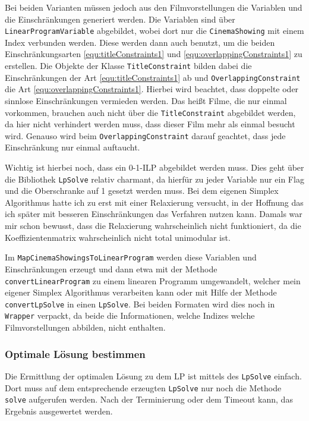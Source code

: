 \documentclass[a4paper, 12pt]{article}
\begin{document}
Bei beiden Varianten müssen jedoch aus den Filmvorstellungen die Variablen und die Einschränkungen generiert werden.
Die Variablen sind über \texttt{LinearProgramVariable} abgebildet, wobei dort nur die \texttt{CinemaShowing} mit einem Index verbunden werden.
Diese werden dann auch benutzt, um die beiden Einschränkungsarten \eqref{equ:titleConstraints1} und \eqref{equ:overlappingConstraints1} zu erstellen.
Die Objekte der Klasse \texttt{TitleConstraint} bilden dabei die Einschränkungen der Art \eqref{equ:titleConstraints1} ab und \texttt{OverlappingConstraint} die Art \eqref{equ:overlappingConstraints1}.
Hierbei wird beachtet, dass doppelte oder sinnlose Einschränkungen vermieden werden.
Das heißt Filme, die nur einmal vorkommen, brauchen auch nicht über die \texttt{TitleConstraint} abgebildet werden, da hier nicht verhindert werden muss, dass dieser Film mehr als einmal besucht wird.
Genauso wird beim \texttt{OverlappingConstraint} darauf geachtet, dass jede Einschränkung nur einmal auftaucht.

Wichtig ist hierbei noch, dass ein 0-1-ILP abgebildet werden muss.
Dies geht über die Bibliothek \texttt{LpSolve} relativ charmant, da hierfür zu jeder Variable nur ein Flag und die Oberschranke auf 1 gesetzt werden muss.
Bei dem eigenen Simplex Algorithmus hatte ich zu erst mit einer Relaxierung versucht, in der Hoffnung das ich später mit besseren Einschränkungen das Verfahren nutzen kann.
Damals war mir schon bewusst, dass die Relaxierung wahrscheinlich nicht funktioniert, da die Koeffizientenmatrix wahrscheinlich nicht total unimodular ist.  

Im \texttt{MapCinemaShowingsToLinearProgram} werden diese Variablen und Einschränkungen erzeugt und dann etwa mit der Methode \linebreak \texttt{convertLinearProgram} zu einem linearen Programm umgewandelt, welcher mein eigener Simplex Algorithmus verarbeiten kann oder mit Hilfe der Methode \texttt{convertLpSolve} in einen \texttt{LpSolve}.
Bei beiden Formaten wird dies noch in \texttt{Wrapper} verpackt, da beide die Informationen, welche Indizes welche Filmvorstellungen abbilden, nicht enthalten.

\subsubsection{Optimale Lösung bestimmen}

Die Ermittlung der optimalen Lösung zu dem LP ist mittels des \texttt{LpSolve} einfach.
Dort muss auf dem entsprechende erzeugten \texttt{LpSolve} nur noch die Methode \texttt{solve} aufgerufen werden.
Nach der Terminierung oder dem Timeout kann, das Ergebnis ausgewertet werden.
\end{document}
